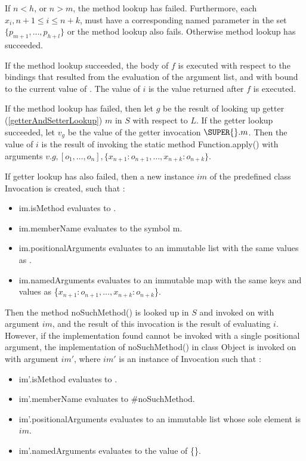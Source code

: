 \documentclass{article}
\newcommand{\code}[1]{{\sf #1}}
\begin{document}
\LMHash{}
If  $n < h$, or $n > m$, the method lookup has failed. Furthermore, each $x_i, n+1 \le i \le n+k$,  must have a corresponding named parameter in the set $\{p_{m+1}, \ldots, p_{h+l}\}$ or the method lookup also fails.  Otherwise method lookup has succeeded.

\LMHash{}
If the method lookup succeeded, the body of $f$ is executed with respect to the bindings that resulted from the evaluation of the argument list, and with \THIS{} bound to the current value of \THIS{}. The value of $i$ is the value returned after $f$ is executed.

\LMHash{}
If the method lookup has failed, then let $g$ be the result of looking up getter (\ref{getterAndSetterLookup}) $m$ in $S$ with respect to $L$. If the getter lookup succeeded, let $v_g$ be the value of the getter invocation $\SUPER{}.m$. Then the value of $i$ is the result of invoking 
the static method \code{Function.apply()} with arguments $v.g, [o_1, \ldots , o_n], \{x_{n+1}: o_{n+1}, \ldots , x_{n+k}: o_{n+k}\}$.
 
\LMHash{}
If  getter lookup has also failed, then a new instance $im$  of the predefined class  \code{Invocation}  is created, such that :
\begin{itemize}
\item  \code{im.isMethod} evaluates to \code{\TRUE{}}.
\item  \code{im.memberName} evaluates to the symbol \code{m}.
\item \code{im.positionalArguments} evaluates to an immutable list with the same  values as  \code{[$o_1, \ldots, o_n$]}.
\item \code{im.namedArguments} evaluates to an immutable map with the same keys and values as \code{\{$x_{n+1}: o_{n+1}, \ldots, x_{n+k} : o_{n+k}$\}}.
\end{itemize}
Then the method \code{noSuchMethod()} is looked up in $S$ and invoked on \THIS{} with argument $im$, and the result of this invocation is the result of evaluating $i$. However, if the implementation found cannot be invoked with a single positional argument, the implementation  of \code{noSuchMethod()} in class \code{Object} is invoked on \THIS{} with argument $im'$, where $im'$ is an instance of \code{Invocation} such that :
\begin{itemize}
\item  \code{im'.isMethod} evaluates to \code{\TRUE{}}.
\item  \code{im'.memberName} evaluates to \code{\#noSuchMethod}.
\item \code{im'.positionalArguments} evaluates to an immutable list whose sole element is  $im$.
\item \code{im'.namedArguments} evaluates to the value of \code{\CONST{} \{\}}.
\end{itemize}
\end{document}
